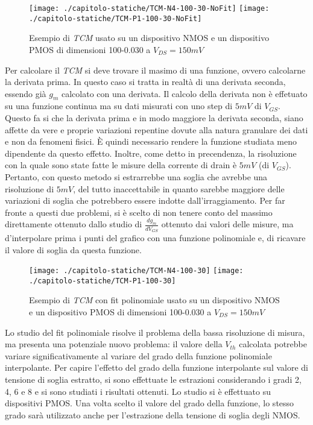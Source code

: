 \begin{figure}[h!]
  \centering
  \texttt{[image: ./capitolo-statiche/TCM-N4-100-30-NoFit]}
  \texttt{[image: ./capitolo-statiche/TCM-P1-100-30-NoFit]}
  \caption{Esempio di \emph{TCM} usato su un dispositivo NMOS e un dispositivo PMOS di dimensioni 100-0.030 a $V_{DS} = 150 mV$}
\end{figure}

Per calcolare il \emph{TCM} si deve trovare il masimo di una funzione, ovvero calcolarne la derivata prima. In questo caso si tratta in realtà di una derivata seconda, essendo già $g_m$ calcolato con una derivata. Il calcolo della derivata non è effetuato su una funzione continua ma su dati misurati con uno step di $5mV$ di $V_{GS}$. Questo fa si che la derivata prima e in modo maggiore la derivata seconda, siano affette da vere e proprie variazioni repentine dovute alla natura granulare dei dati e non da fenomeni fisici. È quindi necessario rendere la funzione studiata meno dipendente da questo effetto. Inoltre, come detto in precendenza, la risoluzione con la quale sono state fatte le misure della corrente di drain è $5mV$ (di $V_{GS}$). Pertanto, con questo metodo si estrarrebbe una soglia che avrebbe una risoluzione di $5mV$, del tutto inaccettabile in quanto sarebbe maggiore delle variazioni di soglia che potrebbero essere indotte dall'irraggiamento.
Per far fronte a questi due problemi, si è scelto di non tenere conto del massimo direttamente ottenuto dallo studio di $\frac{dg_m}{dV_{GS}}$ ottenuto dai valori delle misure, ma d'interpolare prima i punti del grafico con una funzione polinomiale e, di ricavare il valore di soglia da questa funzione.

\begin{figure}[H]
  \centering
  \texttt{[image: ./capitolo-statiche/TCM-N4-100-30]}
  \texttt{[image: ./capitolo-statiche/TCM-P1-100-30]}
  \caption{Esempio di \emph{TCM} con fit polinomiale usato su un dispositivo NMOS e un dispositivo PMOS di dimensioni 100-0.030 a $V_{DS} = 150 mV$}
\end{figure}

Lo studio del fit polinomiale risolve il problema della bassa risoluzione di misura, ma presenta una potenziale nuovo problema: il valore della $V_{th}$ calcolata potrebbe variare significativamente al variare del grado della funzione polinomiale interpolante. Per capire l'effetto del grado della funzione interpolante sul valore di tensione di soglia estratto, si sono effettuate le estrazioni considerando i gradi 2, 4, 6 e 8 e si sono studiati i risultati ottenuti. Lo studio si è effettuato su dispositivi PMOS. Una volta scelto il valore del grado della funzione, lo stesso grado sarà utilizzato anche per l'estrazione della tensione di soglia degli NMOS.

